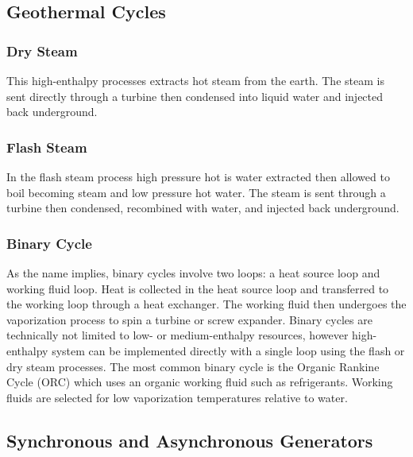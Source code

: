 \subsection{Geothermal Cycles}


\subsubsection{Dry Steam}
This high-enthalpy processes extracts hot steam from the earth. The steam is sent directly through a turbine then condensed into liquid water and injected back underground. 

\subsubsection{Flash Steam} 
In the flash steam process high pressure hot is water extracted then allowed to boil becoming steam and low pressure hot water. The steam is sent through a turbine then condensed, recombined with water, and injected back underground.

\subsubsection{Binary Cycle} 
As the name implies, binary cycles involve two loops: a heat source loop and working fluid loop. Heat is collected in the heat source loop and transferred to the working loop through a heat exchanger. The working fluid then undergoes the vaporization process to spin a turbine or screw expander. Binary cycles are technically not limited to low- or medium-enthalpy resources, however high-enthalpy system can be implemented directly with a single loop using the flash or dry steam processes. The most common binary cycle is the Organic Rankine Cycle (ORC) which uses an organic working fluid such as refrigerants. Working fluids are selected for low vaporization temperatures relative to water.


\subsection{Synchronous and Asynchronous Generators}

